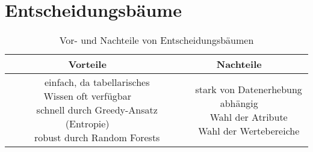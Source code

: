 \documentclass[nonacm=true, language=german]{acmart}
\newcommand{\tabitem}{~~\llap{\textbullet}~~}
\begin{document}
\newpage
\section{Entscheidungsbäume}

\begin{table}[ht]
    \centering
    \begin{tabular}{c|c}
        \toprule
         Vorteile & Nachteile \\
         \midrule
         \makecell{
             \tabitem einfach, da tabellarisches Wissen oft verfügbar \\
             \tabitem schnell durch Greedy-Ansatz (Entropie) \\
             \tabitem robust durch Random Forests
         }
         & 
         \makecell{
             \tabitem stark von Datenerhebung abhängig \\
             \tabitem Wahl der Atribute \\
             \tabitem Wahl der Wertebereiche
         }
         \\
         \bottomrule
    \end{tabular}
    \caption{Vor- und Nachteile von Entscheidungsbäumen}
    \label{tab:decision_trees}
\end{table}
\end{document}
